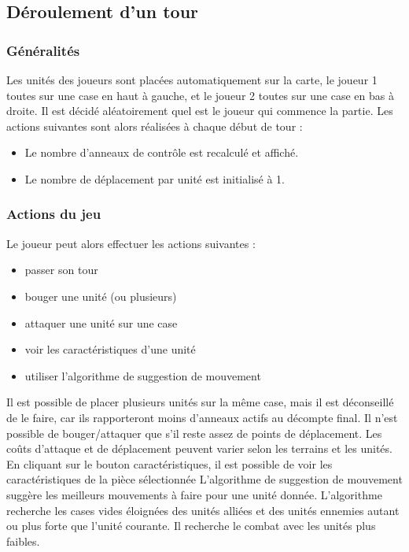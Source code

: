 \subsection{Déroulement d'un tour}
\subsubsection{Généralités}

Les unités des joueurs sont placées automatiquement sur la carte, le joueur 1 toutes sur une case en haut à gauche, et le joueur 2 toutes sur une case en bas à droite. Il est décidé aléatoirement quel est le joueur qui commence la partie.
\newline
\newline
Les actions suivantes sont alors réalisées à chaque début de tour :
\begin{itemize}
\item Le nombre d'anneaux de contrôle est recalculé et affiché.
\item Le nombre de déplacement par unité est initialisé à 1.
\end{itemize}

\subsubsection{Actions du jeu}

Le joueur peut alors effectuer les actions suivantes :
\begin{itemize}
\item passer son tour
\item bouger une unité (ou plusieurs)
\item attaquer une unité sur une case
\item voir les caractéristiques d'une unité
\item utiliser l'algorithme de suggestion de mouvement
\newline
\end{itemize}

Il est possible de placer plusieurs unités sur la même case, mais il est déconseillé de le faire, car ils rapporteront moins d'anneaux actifs au décompte final.
\newline
\newline
Il n'est possible de bouger/attaquer que s'il reste assez de points de déplacement. Les coûts d'attaque et de déplacement peuvent varier selon les terrains et les unités.
\newline
En cliquant sur le bouton caractéristiques, il est possible de voir les caractéristiques de la pièce sélectionnée
\newline
\newline
L'algorithme de suggestion de mouvement suggère les meilleurs mouvements à faire pour une unité donnée. L'algorithme recherche les cases vides éloignées des unités alliées et des unités ennemies autant ou plus forte que l'unité courante. Il recherche le combat avec les unités plus faibles.
\newline
\newline

